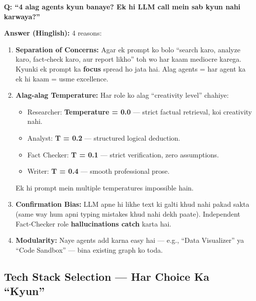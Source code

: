 \documentclass[11pt, a4paper]{article}
\begin{document}
\begin{interviewbox}
\textbf{Q: ``4 alag agents kyun banaye? Ek hi LLM call mein sab kyun nahi karwaya?''}

\textbf{Answer (Hinglish):} 4 reasons:

\begin{enumerate}[label=\textcolor{accentpurple}{\arabic*.}]
\item \textbf{Separation of Concerns:} Agar ek prompt ko bolo ``search karo, analyze karo, fact-check karo, aur report likho'' toh wo har kaam mediocre karega. Kyunki ek prompt ka \textbf{focus} spread ho jata hai. Alag agents = har agent ka ek hi kaam = usme excellence.

\item \textbf{Alag-alag Temperature:} Har role ko alag ``creativity level'' chahiye:
  \begin{itemize}
  \item Researcher: \textbf{Temperature = 0.0} --- strict factual retrieval, koi creativity nahi.
  \item Analyst: \textbf{T = 0.2} --- structured logical deduction.
  \item Fact Checker: \textbf{T = 0.1} --- strict verification, zero assumptions.
  \item Writer: \textbf{T = 0.4} --- smooth professional prose.
  \end{itemize}
  Ek hi prompt mein multiple temperatures impossible hain.

\item \textbf{Confirmation Bias:} LLM apne hi likhe text ki galti khud nahi pakad sakta (same way hum apni typing mistakes khud nahi dekh paate). Independent Fact-Checker role \textbf{hallucinations catch} karta hai.

\item \textbf{Modularity:} Naye agents add karna easy hai --- e.g., ``Data Visualizer'' ya ``Code Sandbox'' --- bina existing graph ko toda.
\end{enumerate}
\end{interviewbox}

\subsection{Tech Stack Selection --- Har Choice Ka ``Kyun''}
\end{document}
